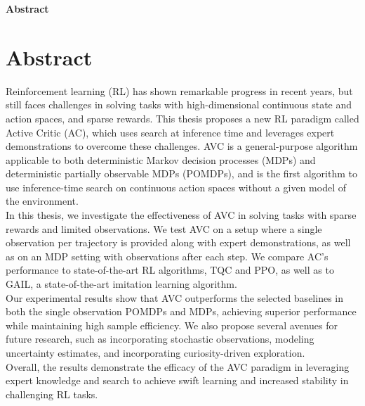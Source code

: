 \clearemptydoublepage
{}
{}

\vspace*{2cm}
\begin{center}
{\Large \textbf{Abstract}}
\end{center}
\vspace{1cm}

\chapter*{Abstract}
\label{chapter:Abstract}

Reinforcement learning (RL) has shown remarkable progress in recent years, but still faces challenges in solving tasks with high-dimensional 
continuous state and action spaces, and sparse rewards. This thesis proposes a new RL paradigm called Active Critic (AC), which uses search at 
inference time and leverages expert demonstrations to overcome these challenges. AVC is a general-purpose algorithm applicable to both deterministic 
Markov decision processes (MDPs) and deterministic partially observable MDPs (POMDPs), and is the first algorithm to use inference-time search on continuous 
action spaces without a given model of the environment.\\

In this thesis, we investigate the effectiveness of AVC in solving tasks with sparse rewards and limited observations. We test AVC on 
a setup where a single observation per trajectory is provided along with expert demonstrations, as well as on an MDP setting with observations 
after each step. We compare AC's performance to state-of-the-art RL algorithms, TQC and PPO, as well as to GAIL, a state-of-the-art imitation 
learning algorithm. \\

Our experimental results show that AVC outperforms the selected baselines in both the single observation POMDPs and MDPs, achieving superior 
performance while maintaining high sample efficiency. We also propose several avenues for future research, such as incorporating stochastic 
observations, modeling uncertainty estimates, and incorporating curiosity-driven exploration.\\

Overall, the results demonstrate the efficacy of the AVC paradigm in leveraging expert knowledge and search to achieve swift learning and 
increased stability in challenging RL tasks.